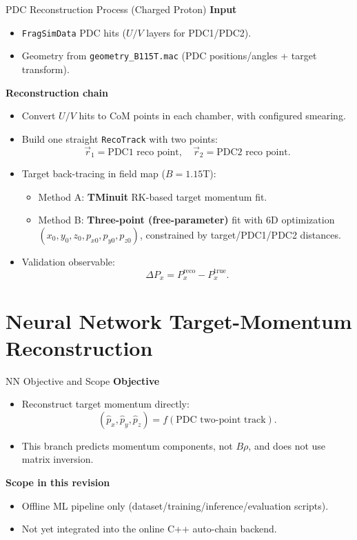 \documentclass[aspectratio=169]{beamer}
\begin{document}
\begin{frame}{PDC Reconstruction Process (Charged Proton)}
\textbf{Input}
\begin{itemize}
\item \texttt{FragSimData} PDC hits (\(U/V\) layers for PDC1/PDC2).
\item Geometry from \texttt{geometry\_B115T.mac} (PDC positions/angles + target transform).
\end{itemize}

\textbf{Reconstruction chain}
\begin{itemize}
\item Convert \(U/V\) hits to CoM points in each chamber, with configured smearing.
\item Build one straight \texttt{RecoTrack} with two points:
\[
\vec{r}_1=\text{PDC1 reco point},\quad \vec{r}_2=\text{PDC2 reco point}.
\]
\item Target back-tracing in field map (\(B=1.15\)T):
\begin{itemize}
\item Method A: \textbf{TMinuit} RK-based target momentum fit.
\item Method B: \textbf{Three-point (free-parameter)} fit with 6D optimization
\((x_0,y_0,z_0,p_{x0},p_{y0},p_{z0})\), constrained by target/PDC1/PDC2 distances.
\end{itemize}
\item Validation observable:
\[
\Delta P_x = P_x^{\mathrm{reco}} - P_x^{\mathrm{true}}.
\]
\end{itemize}
\end{frame}

\section{Neural Network Target-Momentum Reconstruction}

\begin{frame}{NN Objective and Scope}
\textbf{Objective}
\begin{itemize}
\item Reconstruct target momentum directly:
\[
(\hat p_x,\hat p_y,\hat p_z)=f(\text{PDC two-point track}).
\]
\item This branch predicts momentum components, not \(B\rho\), and does not use matrix inversion.
\end{itemize}

\textbf{Scope in this revision}
\begin{itemize}
\item Offline ML pipeline only (dataset/training/inference/evaluation scripts).
\item Not yet integrated into the online C++ auto-chain backend.
\end{itemize}
\end{frame}
\end{document}
